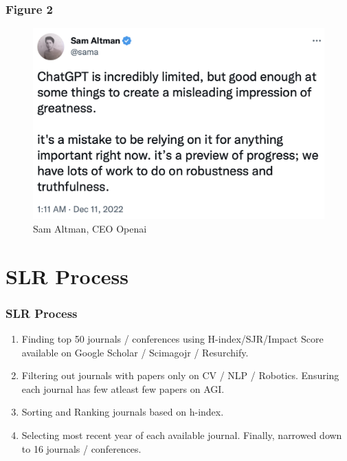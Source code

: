 \documentclass[
	11pt, %
]{beamer}
\begin{document}
\begin{frame}
	\frametitle{Figure 2}
	
	\begin{figure}
        \includegraphics[width=0.8\linewidth]{Images/sama.png}
        \caption{Sam Altman, CEO Openai}
    \end{figure}
    
\end{frame}
\fi
    

\section{SLR Process}

\begin{frame}
	\frametitle{SLR Process}
    

 
	\begin{enumerate}

        \item Finding top 50 journals / conferences using H-index/SJR/Impact Score available on Google Scholar / Scimagojr / Resurchify.
        \bigskip %
		\item Filtering out journals with papers only on CV / NLP / Robotics. Ensuring each journal has few atleast few papers on AGI.
		\bigskip %
		\item Sorting and Ranking journals based on h-index.
	    \bigskip %
        \item Selecting most recent year of each available journal. Finally, narrowed down to 16 journals / conferences.
    \end{enumerate}
	
	\bigskip %
    
\end{frame}
\end{document}
